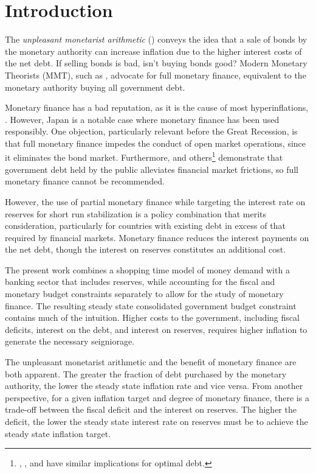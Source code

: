 \documentclass[]{article}
\begin{document}
\pagebreak

\onehalfspacing
\section{Introduction}
 
The \textit{unpleasant monetarist arithmetic} (\textcite{sargent1981unpleasant}) conveys the idea that a sale of bonds by the monetary authority can increase inflation due to the higher interest costs of the net debt. If selling bonds is bad, isn't buying bonds good? Modern Monetary Theorists (MMT), such as \textcite{Kelton2020}, advocate for full monetary finance, equivalent to the monetary authority buying all government debt. 

Monetary finance has a bad reputation, as it is the cause of most hyperinflations, \textcite{sargent1982ends}. However, Japan is a notable case where monetary finance has been used responsibly. One objection, particularly relevant before the Great Recession, is that full monetary finance impedes the conduct of open market operations, since it eliminates the bond market. Furthermore, \textcite{AIYAGARI98debt} and others\footnote{\textcite{Woodford90debt}, \textcite{Azzimonti2019debtwithbanks}, and \textcite{brunnermeier24safe} have similar implications for optimal debt.} demonstrate that government debt held by the public alleviates financial market frictions, so full monetary finance cannot be recommended.

However, the use of partial monetary finance while targeting the interest rate on reserves for short run stabilization is a policy combination that merits consideration, particularly for countries with existing debt in excess of that required by financial markets. Monetary finance reduces the interest payments on the net debt, though the interest on reserves constitutes an additional cost. 

The present work combines a shopping time model of money demand with a banking sector that includes reserves, while accounting for the fiscal and monetary budget constraints separately to allow for the study of monetary finance. The resulting steady state consolidated government budget constraint contains much of the intuition. Higher costs to the government, including fiscal deficits, interest on the debt, and interest on reserves, requires higher inflation to generate the necessary seigniorage.

The unpleasant monetarist arithmetic and the benefit of monetary finance are both apparent. The greater the fraction of debt purchased by the monetary authority, the lower the steady state inflation rate and vice versa. From another perspective, for a given inflation target and degree of monetary finance, there is a trade-off between the fiscal deficit and the interest on reserves. The higher the deficit, the lower the steady state interest rate on reserves must be to achieve the steady state inflation target.
\end{document}
